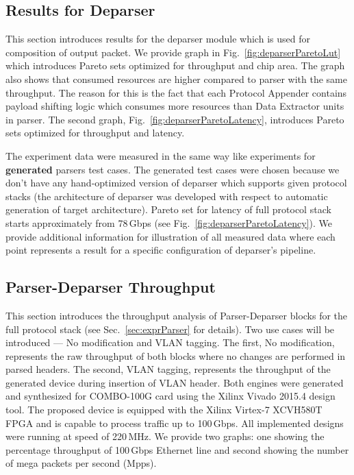 \subsection{Results for Deparser}
\label{sec:exprDeparser}

This section introduces results for the deparser module which is used for composition of output packet. We provide graph in
Fig.~\ref{fig:deparserParetoLut} which introduces Pareto sets optimized for throughput and chip area. The graph also 
shows that consumed resources are higher compared to parser with the same throughput. The reason for this is the fact that
each Protocol Appender contains payload shifting logic which consumes more resources than Data Extractor units in parser.
The second graph, Fig.~\ref{fig:deparserParetoLatency}, introduces Pareto sets optimized for throughput and latency. 

The experiment data were measured in the same way like experiments for \textbf{generated} parsers test cases. 
The generated test cases were chosen because we don't have any hand-optimized version of deparser which supports given protocol stacks 
(the architecture of deparser was developed with respect to automatic generation of target architecture). 
Pareto set for latency of full protocol stack starts approximately from 78\,Gbps (see Fig.~\ref{fig:deparserParetoLatency}). 
We provide additional information for illustration of all measured data where each point represents a result for a specific 
configuration of deparser's pipeline.

\subsection{Parser-Deparser Throughput}
\label{sec:exprParserDeparserThroughput}
This section introduces the throughput analysis of Parser-Deparser blocks for the full protocol stack (see Sec.~\ref{sec:exprParser} for details). 
Two use cases will be introduced --- No modification and VLAN tagging.
The first, No modification, represents the raw throughput of both blocks where no changes are performed in parsed headers. 
The second, VLAN tagging, represents the throughput of the generated device during insertion of VLAN header. 
Both engines were generated and synthesized for COMBO-100G card \cite{combo-100g} using the Xilinx Vivado 2015.4 design tool. 
The proposed device is equipped with the Xilinx Virtex-7 XCVH580T FPGA and is capable to process traffic up to 100\,Gbps. All implemented
designs were running at speed of 220\,MHz. We provide two graphs: one showing the percentage throughput of 100\,Gbps Ethernet line and 
second showing the number of mega packets per second (Mpps).

